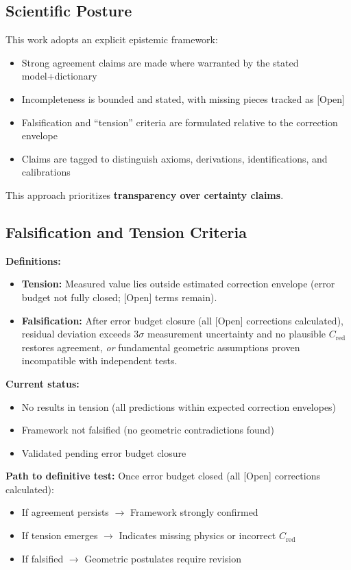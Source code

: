 \subsection*{Scientific Posture}

This work adopts an explicit epistemic framework:
\begin{itemize}
\item Strong agreement claims are made where warranted by the stated model+dictionary
\item Incompleteness is bounded and stated, with missing pieces tracked as [Open]
\item Falsification and ``tension'' criteria are formulated relative to the correction envelope
\item Claims are tagged to distinguish axioms, derivations, identifications, and calibrations
\end{itemize}

This approach prioritizes \textbf{transparency over certainty claims}.

\subsection*{Falsification and Tension Criteria}

\textbf{Definitions:}

\begin{itemize}
\item \textbf{Tension:} Measured value lies outside estimated correction envelope 
  (error budget not fully closed; [Open] terms remain).

\item \textbf{Falsification:} After error budget closure (all [Open] corrections calculated), 
  residual deviation exceeds $3\sigma$ measurement uncertainty and no plausible 
  $C_{\mathrm{red}}$ restores agreement, \textit{or} fundamental geometric assumptions 
  proven incompatible with independent tests.
\end{itemize}

\textbf{Current status:}
\begin{itemize}
\item No results in tension (all predictions within expected correction envelopes)
\item Framework not falsified (no geometric contradictions found)
\item Validated pending error budget closure
\end{itemize}

\textbf{Path to definitive test:}
Once error budget closed (all [Open] corrections calculated):
\begin{itemize}
\item If agreement persists $\to$ Framework strongly confirmed
\item If tension emerges $\to$ Indicates missing physics or incorrect $C_{\mathrm{red}}$
\item If falsified $\to$ Geometric postulates require revision
\end{itemize}

